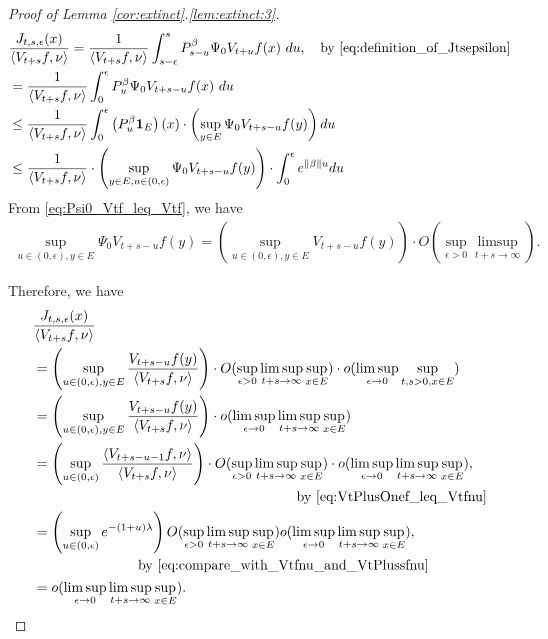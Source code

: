 \documentclass[12pt,a4paper]{amsart}
\numberwithin{equation}{section}
\theoremstyle{plain}
\theoremstyle{definition}
\begin{document}
\begin{proof}[Proof of Lemma \ref{cor:extinct}.\eqref{lem:extinct:3}]
\begin{align}
& \frac{J_{t,s,\epsilon}(x)}{\left\langle V_{t+s}f,\nu \right\rangle} 
= \frac{1}{\left\langle V_{t+s}f,\nu \right\rangle}\int_{s-\epsilon}^s P_{s-u}^\beta \Psi_0 V_{t+u}f (x)~du ,\quad\text{by~\eqref{eq:definition_of_Jtsepsilon}}
\\&= \frac{1}{\left\langle V_{t+s}f,\nu \right\rangle} \int_0^\epsilon P_u^\beta \Psi_0 V_{t+s-u}f(x)~du
  \\ & \leq  \frac{1}{\left\langle V_{t+s}f,\nu \right\rangle} \int_0^\epsilon \left(P_u^\beta \mathbf 1_E\right)(x) \cdot \left( \sup_{y\in E} \Psi_0 V_{t+s - u} f(y) \right) du
  \\ & \leq  \frac{1}{\left\langle V_{t+s}f,\nu \right\rangle}\cdot \left( \sup_{y \in E, u \in (0, \epsilon)}\Psi_0 V_{t+s - u} f(y) \right) \cdot \int_0^\epsilon e^{\|\beta\|u}du 
\end{align}
From \eqref{eq:Psi0_Vtf_leq_Vtf}, we have
\begin{align}
  \sup_{u \in (0,\epsilon),y\in E}\Psi_0 V_{t+s-u}f(y) = \left(\sup_{u \in (0,\epsilon), y\in E} V_{t+s-u}f(y) \right)\cdot O(\sup_{\epsilon > 0}\limsup_{t+s\to \infty} ).
\end{align}

Therefore, we have
\begin{align}
&\frac{J_{t,s,\epsilon}(x)}{\left \langle V_{t+s}f,\nu\right\rangle}
  \\ & =\left(\sup_{u\in (0,\epsilon), y \in E}\frac{V_{t+s-u}f(y)}{\left\langle V_{t+s}f,\nu \right\rangle}\right)\cdot O(\sup_{\epsilon>0}\limsup_{t+s\to \infty} \sup_{x\in E})\cdot o(\limsup_{\epsilon \to 0}\sup_{t,s>0,x\in E})
  \\ & = \left(\sup_{u\in (0,\epsilon), y \in E}\frac{V_{t+s-u}f(y)}{\left\langle V_{t+s}f,\nu \right\rangle}\right)\cdot o(\limsup_{\epsilon \to 0}\limsup_{t+s\to \infty}\sup_{x\in E})
  \\ & \begin{multlined} = \left(\sup_{u\in (0,\epsilon)}\frac{\left\langle V_{t+s - u - 1} f, \nu \right\rangle}{\left\langle V_{t+s}f,\nu \right\rangle} \right) \cdot O(\sup_{\epsilon >  0}\limsup_{t+s \to \infty}\sup_{x\in E}) \cdot o(\limsup_{\epsilon \to 0}\limsup_{t+s\to \infty}\sup_{x\in E}),
\\\quad\text{by~\eqref{eq:VtPlusOnef_leq_Vtfnu}} \end{multlined}
  \\ & \begin{multlined}
= \left(\sup_{u\in (0,\epsilon)}e^{-(1+u) \lambda} \right) O(\sup_{\epsilon > 0} \limsup_{t+s\to \infty}\sup_{x\in E}) o(\limsup_{\epsilon \to 0}\limsup_{t+s\to \infty}\sup_{x\in E}),
\\ \quad\text{by~\eqref{eq:compare_with_Vtfnu_and_VtPlussfnu}}
\end{multlined}
\\ & = o(\limsup_{\epsilon \to 0}\limsup_{t+s\to \infty}\sup_{x\in E}). \label{eq:8}
\end{align}


\end{proof}
\end{document}
